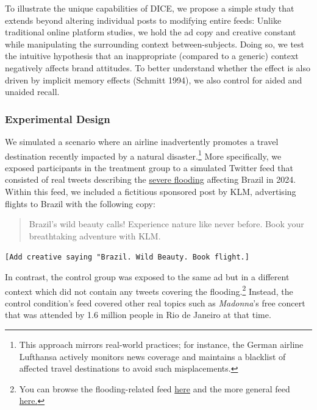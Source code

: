 \documentclass[
  a4paper,
]{scrreprt}
\begin{document}
To illustrate the unique capabilities of DICE, we propose a simple study
that extends beyond altering individual posts to modifying entire feeds:
Unlike traditional online platform studies, we hold the ad copy and
creative constant while manipulating the surrounding context
between-subjects. Doing so, we test the intuitive hypothesis that an
inappropriate (compared to a generic) context negatively affects brand
attitudes. To better understand whether the effect is also driven by
implicit memory effects (Schmitt 1994), we also control for aided and
unaided recall.

\hypertarget{experimental-design}{%
\subsubsection{Experimental Design}\label{experimental-design}}

We simulated a scenario where an airline inadvertently promotes a travel
destination recently impacted by a natural disaster.\footnote{This
  approach mirrors real-world practices; for instance, the German
  airline Lufthansa actively monitors news coverage and maintains a
  blacklist of affected travel destinations to avoid such misplacements.}
More specifically, we exposed participants in the treatment group to a
simulated Twitter feed that consisted of real tweets describing the
\href{https://www.bbc.com/news/articles/cle07g0zzqeo}{severe flooding}
affecting Brazil in 2024. Within this feed, we included a fictitious
sponsored post by KLM, advertising flights to Brazil with the following
copy:

\begin{quote}
Brazil's wild beauty calls! Experience nature like never before. Book
your breathtaking adventure with KLM.
\end{quote}

\texttt{{[}Add\ creative\ saying\ "Brazil.\ Wild\ Beauty.\ Book\ flight.{]}}

In contrast, the control group was exposed to the same ad but in a
different context which did not contain any tweets covering the
flooding.\footnote{You can browse the flooding-related feed
  \href{https://web.archive.org/web/20240509200732/https://ibt-hsg.herokuapp.com/p/6ni2o3bv/DICE/C_Feed/3}{here}
  and the more general feed
  \href{https://web.archive.org/web/20240509200758/https://ibt-hsg.herokuapp.com/p/97fable0/DICE/C_Feed/3}{here.}}
Instead, the control condition's feed covered other real topics such as
\emph{Madonna}'s free concert that was attended by 1.6 million people in
Rio de Janeiro at that time.
\end{document}
